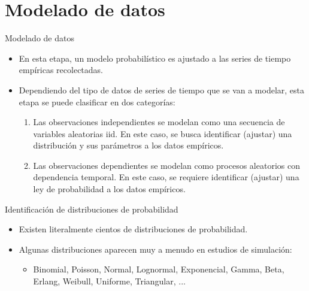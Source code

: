 \section{Modelado de datos}

\begin{frame}{Modelado de datos}
    \begin{itemize}
        \item En esta etapa, un modelo probabilístico es ajustado a las series de tiempo empíricas recolectadas.
        \item Dependiendo del tipo de datos de series de tiempo que se van a modelar, esta etapa se puede clasificar en dos categorías:
        \begin{enumerate}
            \item Las observaciones independientes se modelan como una secuencia de variables aleatorias iid. En este caso, se busca identificar (ajustar) una distribución y sus parámetros a los datos empíricos.
            \item Las observaciones dependientes se modelan como procesos aleatorios con dependencia temporal. En este caso, se requiere identificar (ajustar) una ley de probabilidad a los datos empíricos.
        \end{enumerate}
    \end{itemize}
\end{frame}

\begin{frame}{Identificación de distribuciones de probabilidad}
    \begin{itemize}
        \item Existen literalmente cientos de distribuciones de probabilidad.
        \item Algunas distribuciones aparecen muy a menudo en estudios de simulación:
        \begin{itemize}
            \item Binomial, Poisson, Normal, Lognormal, Exponencial, Gamma, Beta, Erlang, Weibull, Uniforme, Triangular, ...
        \end{itemize}
    \end{itemize}
\end{frame}

